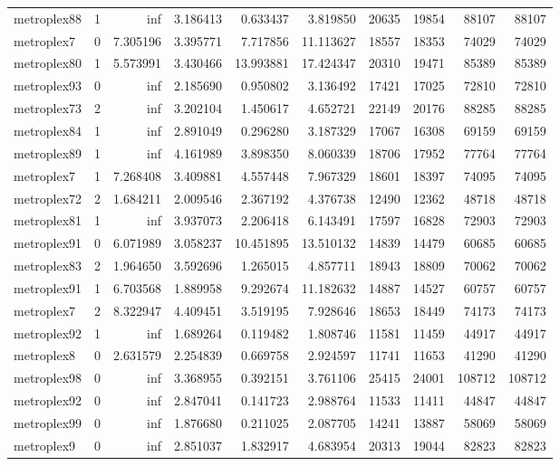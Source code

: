 \begin{longtable}{|l|r|r|r|r|r|r|r|r|r|}
metroplex88 & 1 & inf & 3.186413 & 0.633437 & 3.819850 & 20635 & 19854 & 88107 & 88107 \\
metroplex7 & 0 & 7.305196 & 3.395771 & 7.717856 & 11.113627 & 18557 & 18353 & 74029 & 74029 \\
metroplex80 & 1 & 5.573991 & 3.430466 & 13.993881 & 17.424347 & 20310 & 19471 & 85389 & 85389 \\
metroplex93 & 0 & inf & 2.185690 & 0.950802 & 3.136492 & 17421 & 17025 & 72810 & 72810 \\
metroplex73 & 2 & inf & 3.202104 & 1.450617 & 4.652721 & 22149 & 20176 & 88285 & 88285 \\
metroplex84 & 1 & inf & 2.891049 & 0.296280 & 3.187329 & 17067 & 16308 & 69159 & 69159 \\
metroplex89 & 1 & inf & 4.161989 & 3.898350 & 8.060339 & 18706 & 17952 & 77764 & 77764 \\
metroplex7 & 1 & 7.268408 & 3.409881 & 4.557448 & 7.967329 & 18601 & 18397 & 74095 & 74095 \\
metroplex72 & 2 & 1.684211 & 2.009546 & 2.367192 & 4.376738 & 12490 & 12362 & 48718 & 48718 \\
metroplex81 & 1 & inf & 3.937073 & 2.206418 & 6.143491 & 17597 & 16828 & 72903 & 72903 \\
metroplex91 & 0 & 6.071989 & 3.058237 & 10.451895 & 13.510132 & 14839 & 14479 & 60685 & 60685 \\
metroplex83 & 2 & 1.964650 & 3.592696 & 1.265015 & 4.857711 & 18943 & 18809 & 70062 & 70062 \\
metroplex91 & 1 & 6.703568 & 1.889958 & 9.292674 & 11.182632 & 14887 & 14527 & 60757 & 60757 \\
metroplex7 & 2 & 8.322947 & 4.409451 & 3.519195 & 7.928646 & 18653 & 18449 & 74173 & 74173 \\
metroplex92 & 1 & inf & 1.689264 & 0.119482 & 1.808746 & 11581 & 11459 & 44917 & 44917 \\
metroplex8 & 0 & 2.631579 & 2.254839 & 0.669758 & 2.924597 & 11741 & 11653 & 41290 & 41290 \\
metroplex98 & 0 & inf & 3.368955 & 0.392151 & 3.761106 & 25415 & 24001 & 108712 & 108712 \\
metroplex92 & 0 & inf & 2.847041 & 0.141723 & 2.988764 & 11533 & 11411 & 44847 & 44847 \\
metroplex99 & 0 & inf & 1.876680 & 0.211025 & 2.087705 & 14241 & 13887 & 58069 & 58069 \\
metroplex9 & 0 & inf & 2.851037 & 1.832917 & 4.683954 & 20313 & 19044 & 82823 & 82823 \\

\end{longtable}
